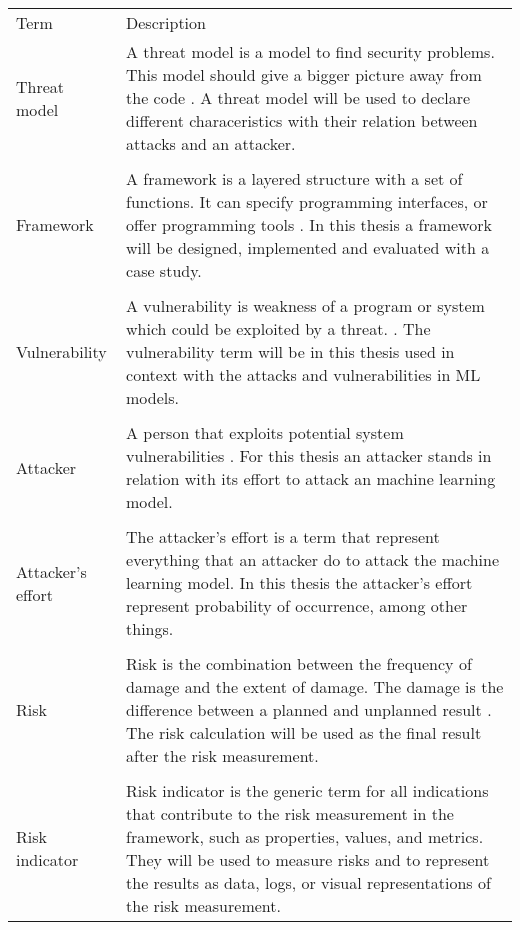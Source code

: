 \newpage

\begin{center}
  \begin{tabular}{ |L{4cm}|L{10cm}|  }
    \hline
     Term & Description \\ [0.5ex]
    Threat model & A threat model is a model to find security problems.
    This model should give a bigger picture away from the code \cite{shostack_2017}. A threat model will be used to declare different characeristics with their relation between attacks and an attacker. \\
    & \\
    \hline
    Framework & A framework is a layered structure with a set of functions. It can specify programming interfaces, or offer programming tools \cite{FIPS1402}. In this thesis a framework will be designed, implemented and evaluated with a case study. \\
    & \\
    \hline
    Vulnerability & A vulnerability is weakness of a program or system which could be exploited by a threat. \cite{FIPS1402}. The vulnerability term will be in this thesis used in context with the attacks and vulnerabilities in ML models. \\
    & \\
    \hline
    Attacker & A person that exploits potential system vulnerabilities \cite{FIPS1402}. For this thesis an attacker stands in relation with its effort to attack an machine learning model. \\
    & \\
    \hline
    Attacker's effort & The attacker's effort is a term that represent everything that an attacker do to attack the machine learning model. In this thesis the attacker's effort represent probability of occurrence, among other things. \\
    & \\
    \hline
    Risk & Risk is the combination between the frequency of damage and
    the extent of damage. The damage is the difference between a
    planned and unplanned result \cite{bsi_glossar_2021}. The risk calculation will be used as the final result after the risk measurement. \\
    & \\
    \hline
    Risk indicator & Risk indicator is the generic term for all indications that contribute to the risk measurement in the framework, such as properties, values, and metrics. They will be used to measure risks and to represent the results as data, logs, or visual representations of the risk measurement. \\

\end{tabular}
\end{center}
